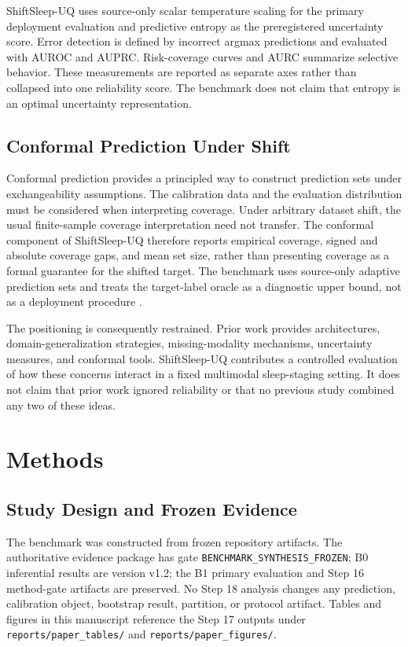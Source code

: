 \documentclass[11pt]{article}
\begin{document}
ShiftSleep-UQ uses source-only scalar temperature scaling for the primary deployment evaluation and predictive entropy as the preregistered uncertainty score. Error detection is defined by incorrect argmax predictions and evaluated with AUROC and AUPRC. Risk-coverage curves and AURC summarize selective behavior. These measurements are reported as separate axes rather than collapsed into one reliability score. The benchmark does not claim that entropy is an optimal uncertainty representation.

\subsection{Conformal Prediction Under Shift}
Conformal prediction provides a principled way to construct prediction sets under exchangeability assumptions. The calibration data and the evaluation distribution must be considered when interpreting coverage. Under arbitrary dataset shift, the usual finite-sample coverage interpretation need not transfer. The conformal component of ShiftSleep-UQ therefore reports empirical coverage, signed and absolute coverage gaps, and mean set size, rather than presenting coverage as a formal guarantee for the shifted target. The benchmark uses source-only adaptive prediction sets and treats the target-label oracle as a diagnostic upper bound, not as a deployment procedure \citep{angelopoulos2023conformal,dey2023conformalordinal}.

The positioning is consequently restrained. Prior work provides architectures, domain-generalization strategies, missing-modality mechanisms, uncertainty measures, and conformal tools. ShiftSleep-UQ contributes a controlled evaluation of how these concerns interact in a fixed multimodal sleep-staging setting. It does not claim that prior work ignored reliability or that no previous study combined any two of these ideas.

\section{Methods}
\subsection{Study Design and Frozen Evidence}
The benchmark was constructed from frozen repository artifacts. The authoritative evidence package has gate \texttt{BENCHMARK\_SYNTHESIS\_FROZEN}; B0 inferential results are version v1.2; the B1 primary evaluation and Step 16 method-gate artifacts are preserved. No Step 18 analysis changes any prediction, calibration object, bootstrap result, partition, or protocol artifact. Tables and figures in this manuscript reference the Step 17 outputs under \texttt{reports/paper\_tables/} and \texttt{reports/paper\_figures/}.
\end{document}
